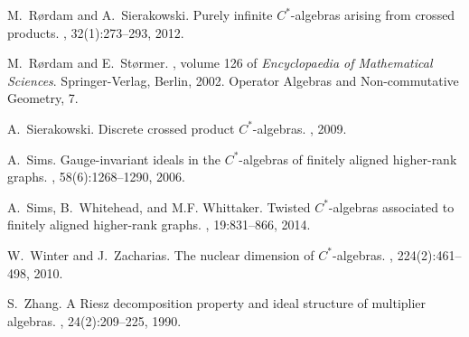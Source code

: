 \documentclass[a4paper, 12pt]{amsart}
\numberwithin{equation}{section}
\theoremstyle{remark}
\theoremstyle{definition}
\begin{document}
\begin{thebibliography}{10}
 M.~R{\o}rdam and A.~Sierakowski.
\newblock Purely infinite {$C^*$}-algebras arising from crossed products.
, 32(1):273--293, 2012.

 M.~R{\o}rdam and E.~St{\o}rmer.
, volume 126 of {\em Encyclopaedia of Mathematical
  Sciences}.
\newblock Springer-Verlag, Berlin, 2002.
\newblock Operator Algebras and Non-commutative Geometry, 7.

 A.~Sierakowski.
\newblock Discrete crossed product {$C^*$}-algebras.
,
  2009.

 A.~Sims.
\newblock Gauge-invariant ideals in the {$C^*$}-algebras of finitely aligned
  higher-rank graphs.
, 58(6):1268--1290, 2006.

 A.~Sims, B.~Whitehead, and M.F. Whittaker.
\newblock Twisted {$C^*$}-algebras associated to finitely aligned higher-rank
  graphs.
, 19:831--866, 2014.

 W.~Winter and J.~Zacharias.
\newblock The nuclear dimension of {$C^*$}-algebras.
, 224(2):461--498, 2010.

 S.~Zhang.
\newblock A {R}iesz decomposition property and ideal structure of multiplier
  algebras.
, 24(2):209--225, 1990.

\end{thebibliography}
\end{document}
